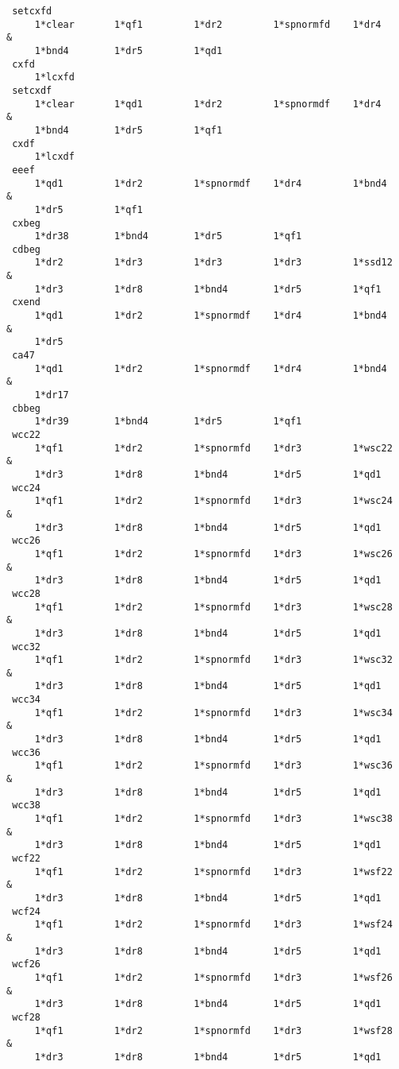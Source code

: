 \begin{footnotesize}
\begin{verbatim}
 setcxfd
     1*clear       1*qf1         1*dr2         1*spnormfd    1*dr4      &
     1*bnd4        1*dr5         1*qd1
 cxfd
     1*lcxfd
 setcxdf
     1*clear       1*qd1         1*dr2         1*spnormdf    1*dr4      &
     1*bnd4        1*dr5         1*qf1
 cxdf
     1*lcxdf
 eeef
     1*qd1         1*dr2         1*spnormdf    1*dr4         1*bnd4     &
     1*dr5         1*qf1
 cxbeg
     1*dr38        1*bnd4        1*dr5         1*qf1
 cdbeg
     1*dr2         1*dr3         1*dr3         1*dr3         1*ssd12    &
     1*dr3         1*dr8         1*bnd4        1*dr5         1*qf1
 cxend
     1*qd1         1*dr2         1*spnormdf    1*dr4         1*bnd4     &
     1*dr5
 ca47
     1*qd1         1*dr2         1*spnormdf    1*dr4         1*bnd4     &
     1*dr17
 cbbeg
     1*dr39        1*bnd4        1*dr5         1*qf1
 wcc22
     1*qf1         1*dr2         1*spnormfd    1*dr3         1*wsc22    &
     1*dr3         1*dr8         1*bnd4        1*dr5         1*qd1
 wcc24
     1*qf1         1*dr2         1*spnormfd    1*dr3         1*wsc24    &
     1*dr3         1*dr8         1*bnd4        1*dr5         1*qd1
 wcc26
     1*qf1         1*dr2         1*spnormfd    1*dr3         1*wsc26    &
     1*dr3         1*dr8         1*bnd4        1*dr5         1*qd1
 wcc28
     1*qf1         1*dr2         1*spnormfd    1*dr3         1*wsc28    &
     1*dr3         1*dr8         1*bnd4        1*dr5         1*qd1
 wcc32
     1*qf1         1*dr2         1*spnormfd    1*dr3         1*wsc32    &
     1*dr3         1*dr8         1*bnd4        1*dr5         1*qd1
 wcc34
     1*qf1         1*dr2         1*spnormfd    1*dr3         1*wsc34    &
     1*dr3         1*dr8         1*bnd4        1*dr5         1*qd1
 wcc36
     1*qf1         1*dr2         1*spnormfd    1*dr3         1*wsc36    &
     1*dr3         1*dr8         1*bnd4        1*dr5         1*qd1
 wcc38
     1*qf1         1*dr2         1*spnormfd    1*dr3         1*wsc38    &
     1*dr3         1*dr8         1*bnd4        1*dr5         1*qd1
 wcf22
     1*qf1         1*dr2         1*spnormfd    1*dr3         1*wsf22    &
     1*dr3         1*dr8         1*bnd4        1*dr5         1*qd1
 wcf24
     1*qf1         1*dr2         1*spnormfd    1*dr3         1*wsf24    &
     1*dr3         1*dr8         1*bnd4        1*dr5         1*qd1
 wcf26
     1*qf1         1*dr2         1*spnormfd    1*dr3         1*wsf26    &
     1*dr3         1*dr8         1*bnd4        1*dr5         1*qd1
 wcf28
     1*qf1         1*dr2         1*spnormfd    1*dr3         1*wsf28    &
     1*dr3         1*dr8         1*bnd4        1*dr5         1*qd1

\end{verbatim}
\end{footnotesize}
